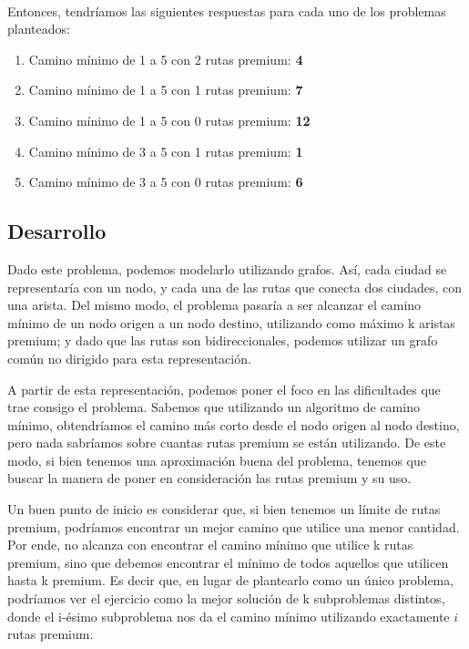 \\
Entonces, tendríamos las siguientes respuestas para cada uno de los problemas planteados:
\begin{enumerate}
\item Camino mínimo de 1 a 5 con 2 rutas premium: \textbf{4}
\item Camino mínimo de 1 a 5 con 1 rutas premium: \textbf{7}
\item Camino mínimo de 1 a 5 con 0 rutas premium: \textbf{12}
\item Camino mínimo de 3 a 5 con 1 rutas premium: \textbf{1}
\item Camino mínimo de 3 a 5 con 0 rutas premium: \textbf{6}
\end{enumerate}
\subsection{Desarrollo}
Dado este problema, podemos modelarlo utilizando grafos. Así, cada ciudad se representaría con un nodo, y cada una de las rutas que conecta dos ciudades, con una arista. Del mismo modo, el problema pasaría a ser alcanzar el camino mínimo de un nodo origen a un nodo destino, utilizando como máximo k aristas premium; y dado que las rutas son bidireccionales, podemos utilizar un grafo común no dirigido para esta representación.
\\
\par
A partir de esta representación, podemos poner el foco en las dificultades que trae consigo el problema. Sabemos que utilizando un algoritmo de camino mínimo, obtendríamos el camino más corto desde el nodo origen al nodo destino, pero nada sabríamos sobre cuantas rutas premium se están utilizando. De este modo, si bien tenemos una aproximación buena del problema, tenemos que buscar la manera de poner en consideración las rutas premium y su uso. 
\\
\par
Un buen punto de inicio es considerar que, si bien tenemos un límite de rutas premium, podríamos encontrar un mejor camino que utilice una menor cantidad. Por ende, no alcanza con encontrar el camino mínimo que utilice k rutas premium, sino que debemos encontrar el mínimo de todos aquellos que utilicen hasta k premium. Es decir que, en lugar de plantearlo como un único problema, podríamos ver el ejercicio como la mejor solución de k subproblemas distintos, donde el i-ésimo subproblema nos da el camino mínimo utilizando exactamente $i$ rutas premium.
\\
\par
